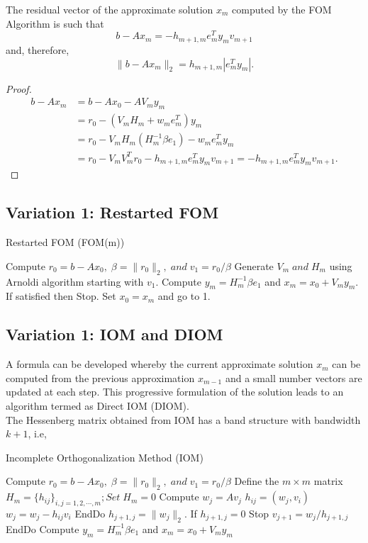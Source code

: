 \documentclass[10pt,a4paper]{article}
\begin{document}
\begin{prop}
The residual vector of the approximate solution $x_m$ computed by the FOM Algorithm is such that 
$$b-Ax_m=-h_{m+1,m}e^T_my_mv_{m+1}$$
and, therefore,
$$\|b-Ax_m\|_2=h_{m+1,m}|e^T_my_m|.$$

\begin{proof}
\begin{align*}
b-Ax_m &= b-Ax_0-AV_my_m \\
&= r_0 - (V_mH_m+w_me^T_m)y_m \\
&= r_0 - V_mH_m(H^{-1}_m\beta e_1) - w_me^T_my_m \\
&= r_0 - V_mV^T_mr_0 - h_{m+1,m}e^T_my_mv_{m+1}=-h_{m+1,m}e^T_my_mv_{m+1}.
\end{align*}
\end{proof}
\end{prop}

\subsection{Variation 1: Restarted FOM}

\begin{algorithm}
\caption{Restarted FOM (FOM(m))}
\begin{algorithmic}[1]
\State Compute $r_0=b-Ax_0,\;\beta=\|r_0\|_2,\;and\;v_1=r_0/\beta$
\State Generate $V_m\;and\;H_m$ using Arnoldi algorithm starting with $v_1$.
\State Compute $y_m=H^{-1}_m\beta e_1$ and $x_m=x_0+V_my_m$. If satisfied then Stop.
\State Set $x_0=x_m$ and go to 1.
\end{algorithmic}
\end{algorithm}

\subsection{Variation 1: IOM and DIOM}

A formula can be developed whereby the current approximate solution $x_m$ can be computed from the previous approximation $x_{m-1}$ and a small number vectors are updated at each step. This progressive formulation of the solution leads to an algorithm termed as Direct IOM (DIOM).\\
The Hessenberg matrix obtained from IOM has a band structure with bandwidth $k+1$, i.e,

\begin{algorithm}
\caption{Incomplete Orthogonalization Method (IOM)}
\begin{algorithmic}[1]
\State Compute $r_0=b-Ax_0,\;\beta=\|r_0\|_2,\;and\;v_1=r_0/\beta$
\State Define the $m\times m$ matrix $H_m = \{h_{ij}\}_{i,j=1,2,\cdots,m};Set\;H_m=0$
	\State Compute $w_j = Av_j$
		\State $h_{ij} = (w_j,v_i)$
		\State $w_j = w_j - h_{ij}v_i$
	\EndFor
	\State EndDo
	\State $h_{j+1,j} = \|w_j\|_2$. If $h_{j+1,j}=0$ Stop
	\State $v_{j+1}=w_j/h_{j+1,j}$
\EndFor
\State EndDo
\State Compute $y_m=H^{-1}_m\beta e_1$ and $x_m=x_0+V_my_m$
\end{algorithmic}
\end{algorithm}
\end{document}
